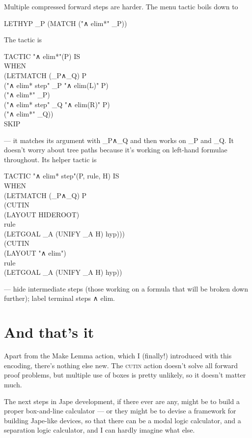 Multiple compressed forward steps are harder. The menu tactic boils down to
\begin{japeish}
LETHYP \_P  (MATCH ("∧ elim*" \_P))
\end{japeish}
The tactic is 
\begin{japeish}
TACTIC "∧ elim*"(P)  IS \\
\tab WHEN \\
\tab \tab (LETMATCH (\_P∧\_Q)  P \\
\tab \tab \tab ("∧ elim* step" \_P  "∧ elim(L)" P) \\
\tab \tab \tab ("∧ elim*" \_P) \\
\tab \tab \tab ("∧ elim* step" \_Q  "∧ elim(R)" P) \\
\tab \tab \tab ("∧ elim*" \_Q)) \\
\tab \tab SKIP
\end{japeish}
--- it matches its argument with \_P∧\_Q and then works on \_P and \_Q. It doesn't worry about tree paths because it's working on left-hand formulae throughout. Its helper tactic is
\begin{japeish}
TACTIC "∧ elim* step"(P, rule, H) IS \\
\tab WHEN \\
\tab \tab (LETMATCH (\_P∧\_Q)  P \\
\tab \tab \tab (CUTIN \\
\tab \tab \tab \tab (LAYOUT HIDEROOT) \\
\tab \tab \tab \tab rule \\
\tab \tab \tab \tab (LETGOAL \_A (UNIFY \_A H) hyp))) \\
\tab \tab (CUTIN \\
\tab \tab \tab (LAYOUT "∧ elim") \\
\tab \tab \tab rule \\
\tab \tab \tab (LETGOAL \_A (UNIFY \_A H) hyp))
\end{japeish}
--- hide intermediate steps (those working on a formula that will be broken down further); label terminal steps ∧ elim.

\section{And that's it}

Apart from the Make Lemma action, which I (finally!) introduced with this encoding, there's nothing else new. The \textsc{cutin} action doesn't solve all forward proof problems, but multiple use of boxes is pretty unlikely, so it doesn't matter much. 

The next steps in Jape development, if there ever are any, might be to build a proper box-and-line calculator --- or they might be to devise a framework for building Jape-like devices, so that there can be a modal logic calculator, and a separation logic calculator, and I can hardly imagine what else.

